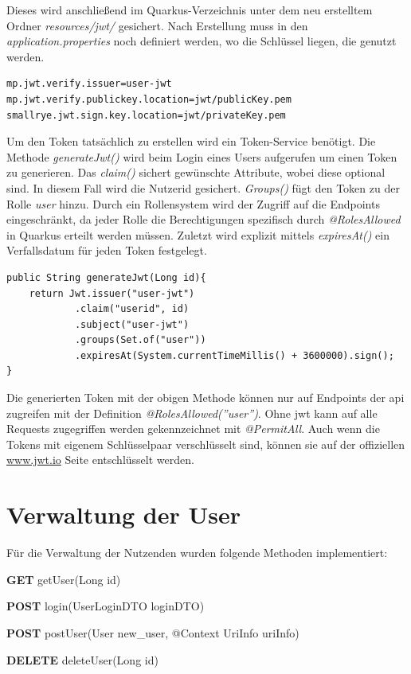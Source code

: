 Dieses wird anschließend im Quarkus-Verzeichnis unter dem neu erstelltem Ordner \emph{resources/jwt/} gesichert. 
Nach Erstellung muss in den \emph{application.properties} noch definiert werden, wo die Schlüssel liegen, die genutzt werden. \cite{jwtAboutQuarkus}
\begin{lstlisting}[label=lst:jwtkonf, caption=JWT Konfigurationen in application.properties]
mp.jwt.verify.issuer=user-jwt
mp.jwt.verify.publickey.location=jwt/publicKey.pem
smallrye.jwt.sign.key.location=jwt/privateKey.pem    
\end{lstlisting}

Um den Token tatsächlich zu erstellen wird ein Token-Service benötigt. 
Die Methode \emph{generateJwt()} wird beim Login eines Users aufgerufen um einen Token zu generieren. 
Das \emph{claim()} sichert gewünschte Attribute, wobei diese optional sind. 
In diesem Fall wird die Nutzerid gesichert. 
\emph{Groups()} fügt den Token zu der Rolle \emph{user} hinzu. 
Durch ein Rollensystem wird der Zugriff auf die Endpoints eingeschränkt, da jeder Rolle die Berechtigungen spezifisch durch \emph{@RolesAllowed} in Quarkus erteilt werden müssen. 
Zuletzt wird explizit mittels \emph{expiresAt()} ein Verfallsdatum für jeden Token festgelegt. 
\cite{jwtAboutQuarkus}
\begin{lstlisting}[label=lst:jwtSign, caption=Methode zum signen von Tokens in JWT-Service]
public String generateJwt(Long id){
    return Jwt.issuer("user-jwt")
            .claim("userid", id)
            .subject("user-jwt")
            .groups(Set.of("user"))
            .expiresAt(System.currentTimeMillis() + 3600000).sign();
}
\end{lstlisting}

Die generierten Token mit der obigen Methode können nur auf Endpoints der \gls{api} zugreifen mit der Definition \emph{@RolesAllowed(''user'')}. 
Ohne \gls{jwt} kann auf alle Requests zugegriffen werden gekennzeichnet mit \emph{@PermitAll}. 
Auch wenn die Tokens mit eigenem Schlüsselpaar verschlüsselt sind, können sie auf der offiziellen \href{https://jwt.io}{www.jwt.io} Seite entschlüsselt werden. \cite{JWTAbout}

\section{Verwaltung der User}
Für die Verwaltung der Nutzenden wurden folgende Methoden implementiert:
\begin{compactitem}
    \item \textbf{GET} getUser(Long id)
    \item \textbf{POST} login(UserLoginDTO loginDTO)
    \item \textbf{POST} postUser(User new\_user, @Context UriInfo uriInfo)
    \item \textbf{DELETE} deleteUser(Long id)
\end{compactitem}

